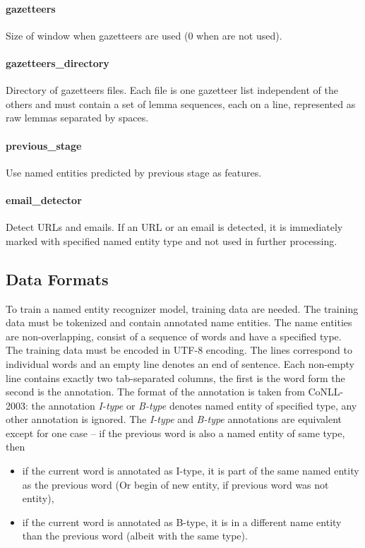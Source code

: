 \paragraph{gazetteers}
Size of window when gazetteers are used (0 when are not used).

\paragraph{gazetteers\_directory}
Directory of gazetteers files. Each file is one gazetteer list independent
of the others and must contain a set of lemma sequences, each on a line,
represented as raw lemmas separated by spaces.

\paragraph{previous\_stage}
Use named entities predicted by previous stage as features.

\paragraph{email\_detector}
Detect URLs and emails. If an URL or an email is detected, it is immediately marked
with specified named entity type and not used in further processing.

\subsection{Data Formats}
To train a named entity recognizer model, training data are needed. The training
data must be tokenized and contain annotated name entities. The name entities
are non-overlapping, consist of a sequence of words and have a specified type.
The training data must be encoded in UTF-8 encoding. The lines correspond to
individual words and an empty line denotes an end of sentence. Each non-empty
line contains exactly two tab-separated columns, the first is the word form the
second is the annotation. The format of the annotation is taken from CoNLL-2003:
the annotation {\it I-type} or {\it B-type} denotes named entity of specified
type, any other annotation is ignored. The {\it I-type} and {\it B-type}
annotations are equivalent except for one case – if the previous word is also a
named entity of same type, then
\begin{itemize}
\item{}if the current word is annotated as I-type, it is part of the same named
entity as the previous word (Or begin of new entity, if previous word was not
entity),
\item{}if the current word is annotated as B-type, it is in a different name
entity than the previous word (albeit with the same type).
\end{itemize}

